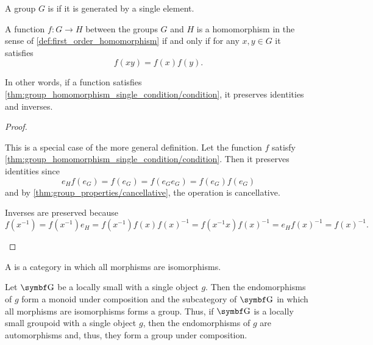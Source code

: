 \begin{definition}\label{def:cyclic_group}
  A group \( G \) is  if it is generated by a single element.
\end{definition}

\begin{proposition}\label{thm:group_homomorphism_single_condition}
  A function \( f: G \to H \) between the groups \( G \) and \( H \) is a homomorphism in the sense of \cref{def:first_order_homomorphism} if and only if for any \( x, y \in G \) it satisfies
  \begin{equation}\label{thm:group_homomorphism_single_condition/condition}
    f(xy) = f(x) f(y).
  \end{equation}

  In other words, if a function satisfies \cref{thm:group_homomorphism_single_condition/condition}, it preserves identities and inverses.
\end{proposition}
\begin{proof}
  \begin{description}
    \Implies This is a special case of the more general definition.
    \ImpliedBy Let the function \( f \) satisfy \cref{thm:group_homomorphism_single_condition/condition}. Then it preserves identities since
    \begin{equation*}
      e_H f(e_G) = f(e_G) = f(e_G e_G) = f(e_G) f(e_G)
    \end{equation*}
    and by \cref{thm:group_properties/cancellative}, the operation is cancellative.

    Inverses are preserved because
    \begin{equation*}
      f(x^{-1})
      =
      f(x^{-1}) e_H
      =
      f(x^{-1}) f(x) f(x)^{-1}
      =
      f(x^{-1} x) f(x)^{-1}
      =
      e_H f(x)^{-1}
      =
      f(x)^{-1}.
    \end{equation*}
  \end{description}
\end{proof}

\begin{definition}\label{def:groupoid}
  A  is a category in which all morphisms are isomorphisms.
\end{definition}

\begin{definition}\label{remark:groupoids}
  Let \( \Bold G \) be a locally small with a single object \( g \). Then the endomorphisms of \( g \) form a monoid under composition and the subcategory of \( \Bold G \) in which all morphisms are isomorphisms forms a group. Thus, if \( \Bold G \) is a locally small groupoid with a single object \( g \), then the endomorphisms of \( g \) are automorphisms and, thus, they form a group under composition.
\end{definition}

